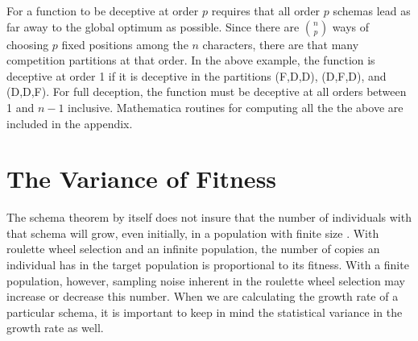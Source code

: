 For a function to be deceptive at order $p$ requires that all order $p$
schemas lead as far away to the global optimum as possible.  Since there
are $n \choose p$ ways of choosing $p$ fixed positions
among the $n$ characters, there are that many competition partitions at
that order.  In the above example, the function is deceptive at order 1 if
it is deceptive in the partitions (F,D,D), (D,F,D), and (D,D,F).
For full deception, the function must be deceptive at all orders between
1 and $n-1$ inclusive.  Mathematica routines for computing all the the
above are included in the appendix.

\section{The Variance of Fitness}
The schema theorem \cite{bible} by itself does not insure that the number of
individuals with that schema will grow, even initially, in a population
with finite size \cite{variance}.  With roulette wheel selection and an
infinite population, the number of copies an individual has in the target
population is proportional to its fitness.  With a finite population, however,
sampling noise inherent in the roulette wheel selection may increase or
decrease this number.  When we are calculating the growth rate of a
particular schema, it is important to keep in mind the statistical variance
in the growth rate as well.

